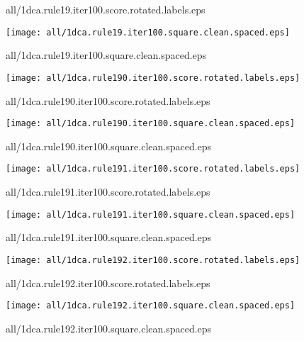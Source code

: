 \documentclass{article}
\begin{document}
{\footnotesize all/1dca.rule19.iter100.score.rotated.labels.eps}
\begin{center}
\begin{minipage}{\textwidth}
\texttt{[image: all/1dca.rule19.iter100.square.clean.spaced.eps]}
\end{minipage}
\end{center}
{\footnotesize all/1dca.rule19.iter100.square.clean.spaced.eps}
\begin{center}
\begin{minipage}{\textwidth}
\texttt{[image: all/1dca.rule190.iter100.score.rotated.labels.eps]}
\end{minipage}
\end{center}
{\footnotesize all/1dca.rule190.iter100.score.rotated.labels.eps}
\begin{center}
\begin{minipage}{\textwidth}
\texttt{[image: all/1dca.rule190.iter100.square.clean.spaced.eps]}
\end{minipage}
\end{center}
{\footnotesize all/1dca.rule190.iter100.square.clean.spaced.eps}
\begin{center}
\begin{minipage}{\textwidth}
\texttt{[image: all/1dca.rule191.iter100.score.rotated.labels.eps]}
\end{minipage}
\end{center}
{\footnotesize all/1dca.rule191.iter100.score.rotated.labels.eps}
\begin{center}
\begin{minipage}{\textwidth}
\texttt{[image: all/1dca.rule191.iter100.square.clean.spaced.eps]}
\end{minipage}
\end{center}
{\footnotesize all/1dca.rule191.iter100.square.clean.spaced.eps}
\begin{center}
\begin{minipage}{\textwidth}
\texttt{[image: all/1dca.rule192.iter100.score.rotated.labels.eps]}
\end{minipage}
\end{center}
{\footnotesize all/1dca.rule192.iter100.score.rotated.labels.eps}
\begin{center}
\begin{minipage}{\textwidth}
\texttt{[image: all/1dca.rule192.iter100.square.clean.spaced.eps]}
\end{minipage}
\end{center}
{\footnotesize all/1dca.rule192.iter100.square.clean.spaced.eps}
\end{document}
